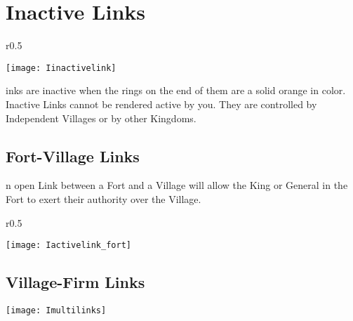 \section{\textsf{Inactive Links}}


\begin{wrapfigure}{r}{0.5\textwidth}
    \vspace{-20pt}
    \begin{center}
        \texttt{[image: Iinactivelink]}
    \end{center}
    \vspace{-50pt}
\end{wrapfigure}

inks are inactive when the rings on the end of them are a solid orange in color. Inactive Links cannot be rendered active by you. They are controlled by Independent Villages or by other Kingdoms. 

\subsection{\textsf{Fort-Village Links}}


n open Link between a Fort and a Village will allow the King or General in the Fort to exert their authority over the Village.

\begin{wrapfigure}{r}{0.5\textwidth}
    \vspace{-20pt}
    \begin{center}
        \texttt{[image: Iactivelink\_fort]}
    \end{center}
    \vspace{-50pt}
\end{wrapfigure}

\subsection{\textsf{Village-Firm Links}}


\begin{center}
    \texttt{[image: Imultilinks]} %
\end{center}


